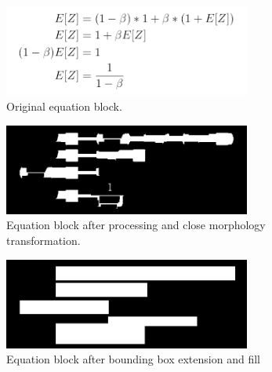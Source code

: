 \documentclass[12pt]{IEEEtran}
\begin{document}
\begin{figure}[h]
  \centering
    \includegraphics[width=3.2in]{eqblock1.png}
  \caption{Original equation block.}
  \label{fig:eqblock1}
\end{figure}

\begin{figure}[h]
  \centering
    \includegraphics[width=3.2in]{eqblock1-morph.png}
  \caption{Equation block after processing and close morphology transformation.}
  \label{fig:eqblock2}
\end{figure}

\begin{figure}[h]
  \centering
    \includegraphics[width=3.2in]{eqblock1-morph2.png}
  \caption{Equation block after bounding box extension and fill}
  \label{fig:eqblock3}
\end{figure}
\end{document}
